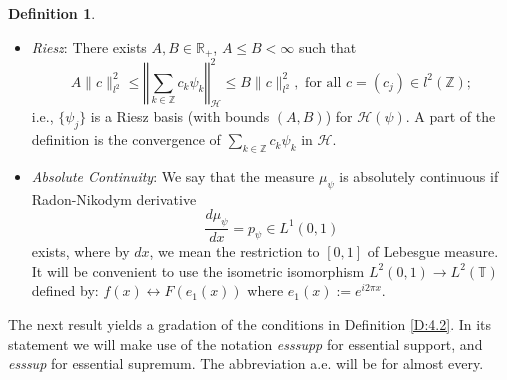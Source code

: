 \documentclass{birkmult}
\theoremstyle{definition}
\newtheorem{defn}[thm]{Definition}
\theoremstyle{remark}
\numberwithin{equation}{section}
\begin{document}
\begin{defn}
\begin{itemize}
  \item \textit{Riesz}:
    There exists $A, B \in \mathbb{R}_{+}$, $A \leq B < \infty$ such that 
    \begin{equation}
    \label{E:4.9} 
      A\|c\|_{l^{2}}^{2} \leq 
      \left\Vert \sum_{k \in \mathbb{Z}} c_{k}\psi_{k}\right\Vert_{\mathcal{H}}^{2} \leq
      B\|c\|_{l^{2}}^{2}, \text{ for all } c=(c_{j}) \in l^{2}(\mathbb{Z}); 
    \end{equation}
    i.e., $\{\psi_{j}\}$ is a Riesz basis (with bounds $(A,B)$) for 
    $\mathcal{H}(\psi)$.  A part of the definition is the convergence of 
    $\sum_{k \in \mathbb{Z}} c_{k}\psi_{k}$ in $\mathcal{H}$.
  \item \textit{Absolute Continuity}:
    We say that the measure $\mu_{\psi}$ is absolutely continuous if 
    Radon-Nikodym derivative
    \begin{equation}
    \label{E:4.11}
      \frac{d\mu_{\psi}}{dx}=p_{\psi} \in L^{1}(0,1)
    \end{equation}
    exists, where by $dx$, we mean the restriction to $[0,1]$ of Lebesgue
    measure.  It will be convenient to use the isometric isomorphism
    $L^{2}(0,1) \to L^{2}(\mathbb{T})$ defined by: 
    $f(x) \longleftrightarrow F(e_{1}(x))$ where $e_{1}(x) := e^{i2\pi x}$.
\end{itemize}
\end{defn}

The next result yields a gradation of the conditions in Definition 
\ref{D:4.2}.  In its statement we will make use of the notation 
\textit{esssupp} for essential support, and \textit{esssup} for essential 
supremum.  The abbreviation a.e. will be for almost every.  
\end{document}
